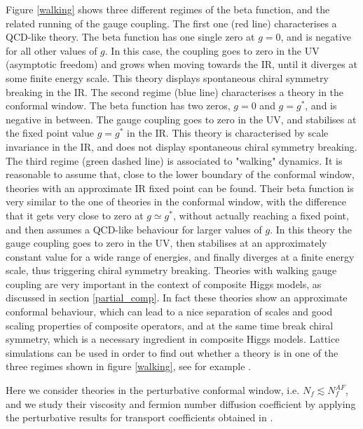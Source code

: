 Figure \ref{walking} shows three different regimes of the beta function, and the related running of the gauge coupling. The first one (red line) characterises a QCD-like theory. The beta function has one single zero at $g=0$, and is negative for all other values of $g$. In this case, the coupling goes to zero in the UV (asymptotic freedom) and grows when moving towards the IR, until it diverges at some finite energy scale. This theory displays spontaneous chiral symmetry breaking in the IR. The second regime (blue line) characterises a theory in the conformal window. The beta function has two zeros, $g=0$ and $g=g^*$, and is negative in between. The gauge coupling goes to zero in the UV, and stabilises at the fixed point value $g=g^*$ in the IR. This theory is characterised by scale invariance in the IR, and does not display spontaneous chiral symmetry breaking. The third regime (green dashed line) is associated to "walking" dynamics. It is reasonable to assume that, close to the lower boundary of the conformal window, theories with an approximate IR fixed point can be found. Their beta function is very similar to the one of theories in the conformal window, with the difference that it gets very close to zero at $g\simeq g^*$, without actually reaching a fixed point, and then assumes a QCD-like behaviour for larger values of $g$. In this theory the gauge coupling goes to zero in the UV, then stabilises at an approximately constant value for a wide range of energies, and finally diverges at a finite energy scale, thus triggering chiral symmetry breaking. Theories with walking gauge coupling are very important in the context of composite Higgs models, as discussed in section \ref{partial_comp}. In fact these theories show an approximate conformal behaviour, which can lead to a nice separation of scales and good scaling properties of composite operators, and at the same time break chiral symmetry, which is a necessary ingredient in composite Higgs models.
Lattice simulations can be used in order to find out whether a theory is in one of the three regimes shown in figure \ref{walking}, see for example \cite{Hietanen:2008mr,Hansen:2017ejh}.

Here we consider theories in the perturbative conformal window, i.e. $N_f \lesssim N_f^{AF}$, and we study their viscosity and fermion number diffusion coefficient by applying the perturbative results for transport coefficients obtained in \cite{Arnold:2000dr}.



